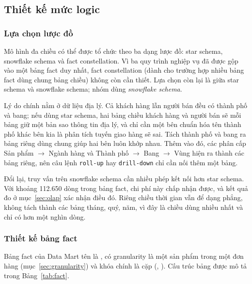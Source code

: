 \subsection{Thiết kế mức logic}

\subsubsection{Lựa chọn lược đồ}\label{sec:luocdo}

Mô hình đa chiều có thể được tổ chức theo ba dạng lược đồ: star schema, snowflake schema và fact constellation. Vì ba quy trình nghiệp vụ đã được gộp vào một bảng fact duy nhất, fact constellation (dành cho trường hợp nhiều bảng fact dùng chung bảng chiều) không còn cần thiết. Lựa chọn còn lại là giữa star schema và snowflake schema; nhóm dùng \textit{snowflake schema}.

Lý do chính nằm ở dữ liệu địa lý. Cả khách hàng lẫn người bán đều có thành phố và bang; nếu dùng star schema, hai bảng chiều khách hàng và người bán sẽ mỗi bảng giữ một bản sao thông tin địa lý, và chỉ cần một bên chuẩn hóa tên thành phố khác bên kia là phân tích tuyến giao hàng sẽ sai. Tách thành phố và bang ra bảng riêng dùng chung giúp hai bên luôn khớp nhau. Thêm vào đó, các phân cấp Sản phẩm $\rightarrow$ Ngành hàng và Thành phố $\rightarrow$ Bang $\rightarrow$ Vùng hiện ra thành các bảng riêng, nên câu lệnh \texttt{roll-up} hay \texttt{drill-down} chỉ cần nối thêm một bảng.

Đổi lại, truy vấn trên snowflake schema cần nhiều phép kết nối hơn star schema. Với khoảng 112.650 dòng trong bảng fact, chi phí này chấp nhận được, và kết quả đo ở mục~\ref{sec:olap} xác nhận điều đó. Riêng chiều thời gian vẫn để dạng phẳng, không tách thành các bảng tháng, quý, năm, vì đây là chiều dùng nhiều nhất và chỉ có hơn một nghìn dòng.

\subsubsection{Thiết kế bảng fact}

Bảng fact của Data Mart tên là , có granularity là một sản phẩm trong một đơn hàng (mục~\ref{sec:granularity}) và khóa chính là cặp (, ). Cấu trúc bảng được mô tả trong Bảng~\ref{tab:fact}.

